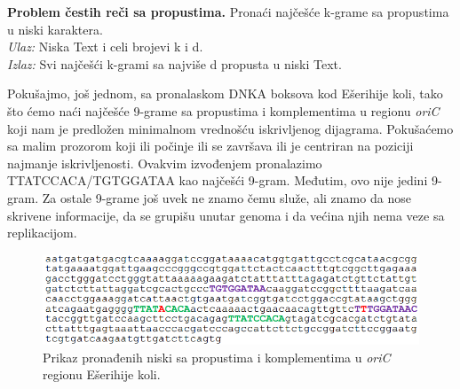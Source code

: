 \begin{tcolorbox}
\textbf{Problem čestih reči sa propustima.} Pronaći najčešće k-grame sa
propustima u niski karaktera.\\
\textit{Ulaz:} Niska Text i celi brojevi k i d.\\
\textit{Izlaz:} Svi najčešći k-grami sa najviše d propusta u niski Text.
\end{tcolorbox}

Pokušajmo, još jednom, sa pronalaskom DNKA boksova kod Ešerihije koli, tako što ćemo naći najčešće 9-grame sa propustima i komplementima u regionu \textit{oriC} koji nam je predložen minimalnom vrednošću iskrivljenog dijagrama. Pokušaćemo sa malim prozorom koji ili počinje ili se završava ili je centriran na poziciji najmanje iskrivljenosti. Ovakvim izvođenjem pronalazimo TTATCCACA/TGTGGATAA kao najčešći 9-gram. Međutim, ovo nije jedini 9-gram. Za ostale 9-grame još uvek ne znamo čemu služe, ali znamo da nose skrivene informacije, da se grupišu unutar genoma i da većina njih nema veze sa replikacijom. 

\begin{figure}[H]
\caption{Prikaz pronađenih niski sa propustima i komplementima u \textit{oriC} regionu Ešerihije koli.}
\centering
\includegraphics[width=1\textwidth]{poglavlja/1/slike/ecoli_poslednji.png}
\end{figure} 

